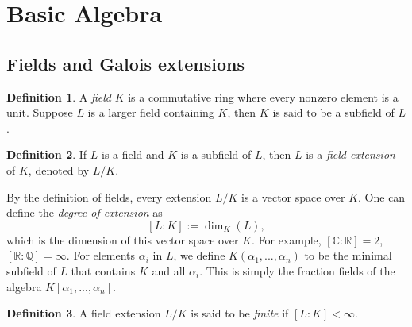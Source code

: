\documentclass[12pt]{article}
\theoremstyle{remark}
\theoremstyle{definition}
\newtheorem{definition}{Definition}[subsection]
\newcommand{\R}[0]{\mathbb{R}}
\newcommand{\Q}[0]{\mathbb{Q}}
\newcommand{\C}[0]{\mathbb{C}}
\begin{document}
 
 

 
 
 
 
 
 
 
 
    \newpage
    \section{Basic Algebra}
    \subsection{Fields and Galois extensions}\label{ssec-fields}
        \begin{definition}%
            A \textit{field} $K$ is a commutative ring where every nonzero element is a unit. Suppose $L$ is a larger field containing $K$, then $K$ is said to be a subfield of $L$.
        \end{definition}
        \begin{definition}%
            If $L$ is a field and $K$ is a subfield of $L$, then $L$ is a \textit{field extension} of $K$, denoted by $L/K$.
        \end{definition}
        By the definition of fields, every extension $L/K$ is a vector space over $K$. One can define the \textit{degree of extension} as
        \[[L:K] := \dim_K(L),\] 
        which is the dimension of this vector space over $K$. For example, $[\C : \R] = 2$, $[\R : \Q] = \infty$. For elements $\alpha_i$ in $L$, we define $K(\alpha_1, ..., \alpha_n)$ to be the minimal subfield of $L$ that contains $K$ and all $\alpha_i$. This is simply the fraction fields of the algebra $K[\alpha_1, ..., \alpha_n]$.
        
        \begin{definition}%
            A field extension $L/K$ is said to be \textit{finite} if $[L:K]<\infty$.
        \end{definition}
        
\end{document}
